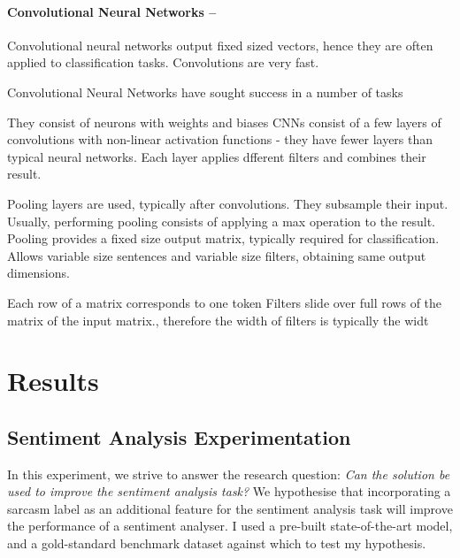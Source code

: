 \documentclass[12pt,a4paper]{article}
\begin{document}
\paragraph{Convolutional Neural Networks --}

Convolutional neural networks output fixed sized vectors, hence they are often applied to classification tasks. Convolutions are very fast.

Convolutional Neural Networks have sought success in a number of tasks



They consist of neurons with weights and biases
CNNs consist of a few layers of convolutions with non-linear activation functions - they have fewer layers than typical neural networks. Each layer applies dfferent filters and combines their result.

Pooling layers are used, typically after convolutions. They subsample their input. Usually, performing pooling consists of applying a max operation to the result. Pooling provides a fixed size output matrix, typically required for classification. Allows variable size sentences and variable size filters, obtaining same output dimensions. 

Each row of a matrix corresponds to one token
Filters slide over full rows of the matrix of the input matrix., therefore the width of filters is typically the widt




\section{Results}




\subsection{Sentiment Analysis Experimentation}
In this experiment, we strive to answer the research question: \textit{Can the solution be used to improve the sentiment analysis task?} We hypothesise that incorporating a sarcasm label as an additional feature for the sentiment analysis task will improve the performance of a sentiment analyser. I used a pre-built state-of-the-art model, and a gold-standard benchmark dataset against which to test my hypothesis.
\end{document}
